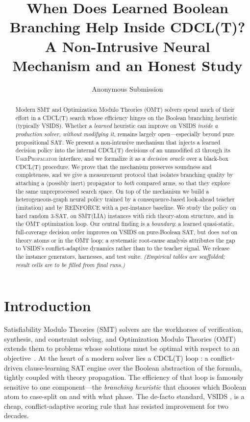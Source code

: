 \documentclass[letterpaper]{article} %
\title{When Does Learned Boolean Branching Help Inside {CDCL(T)}?\\
A Non-Intrusive Neural Mechanism and an Honest Study}
\author{
    Anonymous Submission
}
\theoremstyle{definition}
\theoremstyle{plain}
\theoremstyle{remark}
\newcommand{\solver}{\textsc{z3}}
\begin{document}
\maketitle

\begin{abstract}
Modern SMT and Optimization Modulo Theories (OMT) solvers spend much of
their effort in a \textsc{CDCL(T)} search whose efficiency hinges on the
Boolean branching heuristic (typically VSIDS). Whether a \emph{learned}
heuristic can improve on VSIDS \emph{inside a production solver, without
modifying it}, remains largely open---especially beyond pure propositional
SAT. We present a non-intrusive mechanism that injects a learned decision
policy into the internal \textsc{CDCL(T)} decisions of an unmodified
\solver{} through its \textsc{UserPropagator} interface, and we formalize
it as a \emph{decision oracle} over a black-box \textsc{CDCL(T)} procedure.
We prove that the mechanism preserves soundness and completeness, and we
give a measurement protocol that isolates branching quality by attaching a
(possibly inert) propagator to \emph{both} compared arms, so that they
explore the same unpreprocessed search space. On top of the mechanism we
build a heterogeneous-graph neural policy trained by a consequence-based
look-ahead teacher (imitation) and by REINFORCE with a per-instance
baseline. We study the policy on hard random 3-SAT, on SMT(LIA) instances
with rich theory-atom structure, and in the OMT optimization loop. Our
central finding is a \emph{boundary}: a learned quasi-static, full-coverage
decision order improves on VSIDS on pure-Boolean SAT, but does \emph{not}
on theory atoms or in the OMT loop; a systematic root-cause analysis
attributes the gap to VSIDS's conflict-adaptive dynamics rather than to the
teacher signal. We release the instance generators, harnesses, and test
suite. \emph{(Empirical tables are scaffolded; result cells are to be filled
from final runs.)}
\end{abstract}

\section{Introduction}

Satisfiability Modulo Theories (SMT) solvers are the workhorses of
verification, synthesis, and constraint solving, and Optimization Modulo
Theories (OMT) extends them to problems whose solutions must be optimal with
respect to an objective~\citep{barrett2021smt,sebastiani2015pushing,bjorner2015nz}.
At the heart of a modern solver lies a \textsc{CDCL(T)} loop
\citep{nieuwenhuis2006dpllt}: a conflict-driven clause-learning SAT engine
over the Boolean abstraction of the formula, tightly coupled with theory
propagation. The efficiency of that loop is famously sensitive to one
component---the \emph{branching heuristic} that chooses which Boolean atom
to case-split on and with what phase. The de-facto standard, VSIDS
\citep{moskewicz2001chaff}, is a cheap, conflict-adaptive scoring rule that
has resisted improvement for two decades.
\end{document}
